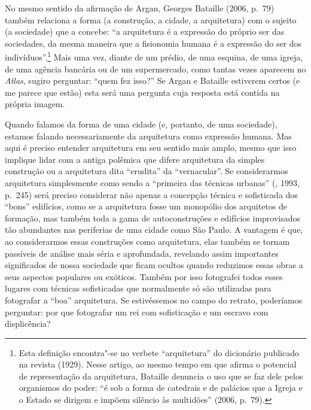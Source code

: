 No mesmo sentido da afirmação de Argan, Georges Bataille (2006, p.~79)
também relaciona a forma (a construção, a cidade, a arquitetura) com o
sujeito (a sociedade) que a concebe: ``a arquitetura é a expressão do
próprio ser das sociedades, da mesma maneira que a fisionomia humana é a
expressão do ser dos indivíduos''.\footnote{Esta definição encontra"-se
  no verbete ``arquitetura'' do dicionário publicado na revista
  {} (1929). Nesse artigo, ao mesmo tempo em que afirma o
  potencial de representação da arquitetura, Bataille denuncia o uso que
  se faz dele pelos organismos do poder: ``é sob a forma de catedrais e
  de palácios que a Igreja e o Estado se dirigem e impõem silêncio às
  multidões'' (2006, p.~79).} Mais uma vez, diante de um prédio, de uma
esquina, de uma igreja, de uma agência bancária ou de um supermercado,
como tantas vezes aparecem no \emph{Atlas}, sugiro perguntar: ``quem fez
isso?'' Se Argan e Bataille estiverem certos (e me parece que estão)
esta será uma pergunta cuja resposta está contida na própria imagem.

Quando falamos da forma de uma cidade (e, portanto, de uma sociedade),
estamos falando necessariamente da arquitetura como expressão humana.
Mas aqui é preciso entender arquitetura em seu sentido mais amplo, mesmo
que isso implique lidar com a antiga polêmica que difere arquitetura da
simples construção ou a arquitetura dita ``erudita'' da ``vernacular''.
Se considerarmos arquitetura simplesmente como sendo a ``primeira das
técnicas urbanas'' (, 1993, p.~245) será preciso considerar não
apenas a concepção técnica e sofisticada dos ``bons'' edifícios, como se
a arquitetura fosse um monopólio dos arquitetos de formação, mas também
toda a gama de autoconstruções e edifícios improvisados tão abundantes
nas periferias de uma cidade como São Paulo. A vantagem é que, ao
considerarmos essas construções como arquitetura, elas também se tornam
passíveis de análise mais séria e aprofundada, revelando assim
importantes significados de nossa sociedade que ficam ocultos quando
reduzimos essas obras a seus aspectos populares ou exóticos. Também por
isso fotografei todos esses lugares com técnicas sofisticadas que
normalmente só são utilizadas para fotografar a ``boa'' arquitetura. Se
estivéssemos no campo do retrato, poderíamos perguntar: por que
fotografar um rei com sofisticação e um escravo com displicência?

